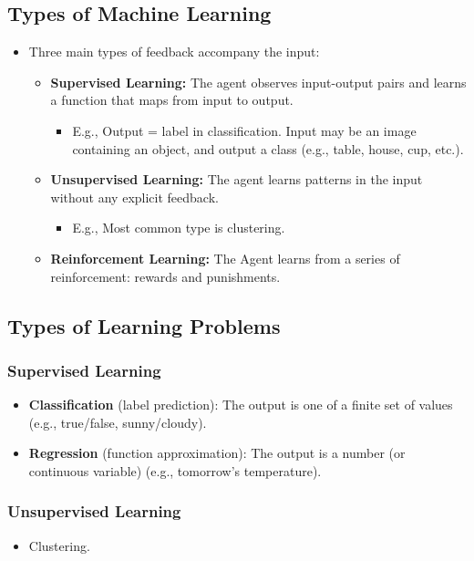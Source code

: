 \documentclass[8pt]{article}
\begin{document}
\subsection*{Types of Machine Learning}
\begin{itemize}
    \item Three main types of feedback accompany the input:
    \begin{itemize}
        \item \textbf{Supervised Learning:} The agent observes input-output pairs and learns a function that maps from input to output.
        \begin{itemize}
            \item E.g., Output = label in classification. Input may be an image containing an object, and output a class (e.g., table, house, cup, etc.).
        \end{itemize}
        \item \textbf{Unsupervised Learning:} The agent learns patterns in the input without any explicit feedback.
        \begin{itemize}
            \item E.g., Most common type is clustering.
        \end{itemize}
        \item \textbf{Reinforcement Learning:} The Agent learns from a series of reinforcement: rewards and punishments.
    \end{itemize}
\end{itemize}

\subsection*{Types of Learning Problems}
\subsubsection*{Supervised Learning}
\begin{itemize}
    \item \textbf{Classification} (label prediction): The output is one of a finite set of values (e.g., true/false, sunny/cloudy).
    \item \textbf{Regression} (function approximation): The output is a number (or continuous variable) (e.g., tomorrow's temperature).
\end{itemize}
\subsubsection*{Unsupervised Learning}
\begin{itemize}
    \item Clustering.
\end{itemize}
\end{document}
